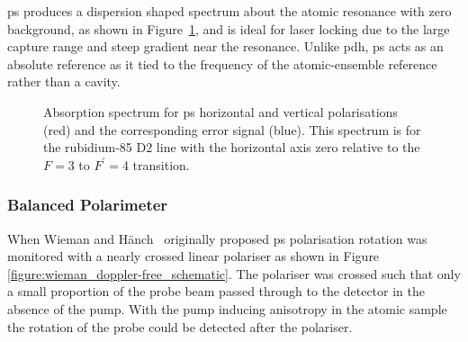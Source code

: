 
\Gls{ps} produces a dispersion shaped spectrum about the atomic resonance with zero background, as shown in Figure~\ref{figure:polspecspectrum}, and is ideal for laser locking due to the large capture range and steep gradient near the resonance.
Unlike \gls{pdh}, \gls{ps} acts as an absolute reference as it tied to the frequency of the atomic-ensemble reference rather than a cavity.

\begin{figure}
\center

\caption{Absorption spectrum for \gls{ps} horizontal and vertical polarisations (red) and the corresponding error signal (blue). This spectrum is for the rubidium-85 D2 line with the horizontal axis zero relative to the $F=3$ to $F^\prime=4$ transition.}
\label{figure:polspecspectrum}
\end{figure}

\subsubsection{Balanced Polarimeter}

When Wieman and H\"anch~\cite{wieman_doppler-free_1976} originally proposed \gls{ps} polarisation rotation was monitored with a nearly crossed linear polariser as shown in Figure \ref{figure:wieman_doppler-free_schematic}.
The polariser was crossed such that only a small proportion of the probe beam passed through to the detector in the absence of the pump.
With the pump inducing anisotropy in the atomic sample the rotation of the probe could be detected after the polariser.

